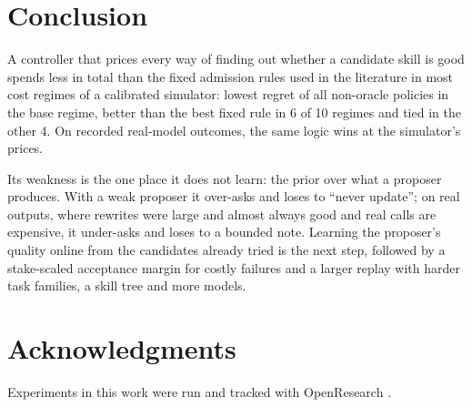 \documentclass[11pt]{article}
\begin{document}
\section{Conclusion}
A controller that prices every way of finding out whether a candidate skill is good spends
less in total than the fixed admission rules used in the literature in most cost regimes of
a calibrated simulator: lowest regret of all non-oracle policies in the base regime, better
than the best fixed rule in 6 of 10 regimes and tied in the other 4.  On recorded real-model
outcomes, the same logic wins at the simulator's prices.

Its weakness is the one place it does not learn: the prior over what a proposer produces.
With a weak proposer it over-asks and loses to ``never update''; on real outputs, where
rewrites were large and almost always good and real calls are expensive, it under-asks and
loses to a bounded note.  Learning the proposer's quality online from the candidates already
tried is the next step, followed by a stake-scaled acceptance margin for costly failures and a
larger replay with harder task families, a skill tree and more models.

\section*{Acknowledgments}
Experiments in this work were run and tracked with OpenResearch \citep{openresearch}.
\end{document}
